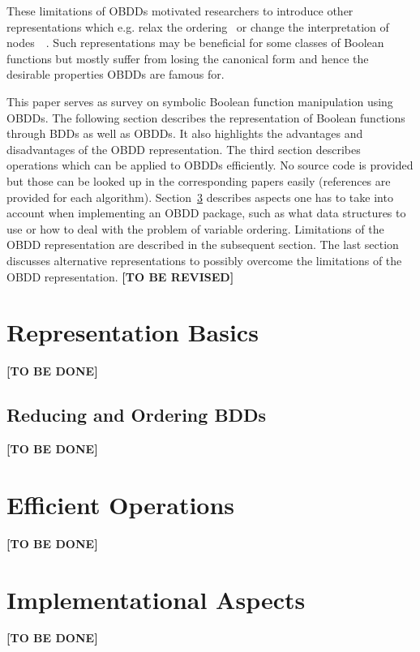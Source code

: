 \documentclass{vldb}
\newcommand{\tbr}{\textbf{[TO BE REVISED]}}
\newcommand{\tbd}{\textbf{[TO BE DONE]}}
\begin{document}
These limitations of OBDDs motivated researchers to introduce other
representations which e.g. relax the ordering~\cite{BRYANT95} or change the
interpretation of nodes~\cite{BRYANT95}~\cite{ANDERSEN97}. Such representations
may be beneficial for some classes of Boolean functions but mostly suffer from
losing the canonical form and hence the desirable properties OBDDs are famous for.

This paper serves as survey on symbolic Boolean function manipulation using OBDDs.
The following section describes the representation of Boolean functions through
BDDs as well as OBDDs. It also highlights the advantages and disadvantages of the
OBDD representation. The third section describes operations which can be applied
to OBDDs efficiently. No source code is provided but those can be looked up in
the corresponding papers easily (references are provided for each algorithm).
Section~\ref{sec:implementation-aspects} describes aspects one has to take into
account when implementing an OBDD package, such as what data structures to use
or how to deal with the problem of variable ordering. Limitations of the OBDD
representation are described in the subsequent section. The last section
discusses alternative representations to possibly overcome the limitations of
the OBDD representation.
\tbr

\section{Representation Basics}
\label{sec:representation-basics}

\tbd

\subsection{Reducing and Ordering BDDs}
\label{subsec:reducing-and-ordering-bdds}

\tbd

\section{Efficient Operations}
\label{sec:efficient-operations}

\tbd

\section{Implementational Aspects}
\label{sec:implementation-aspects}

\tbd
\end{document}
